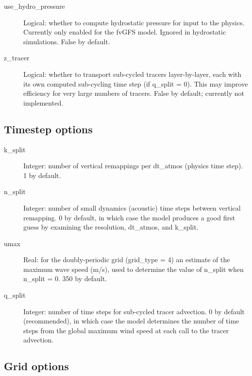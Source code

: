 \documentclass[12pt,letterpaper]{book}
\begin{document}
\begin{description}
\item[use\_hydro\_pressure] Logical: whether to compute hydrostatic pressure for input to the physics. Currently only enabled for the fvGFS model. Ignored in hydrostatic simulations. False by default.


\item[z\_tracer] Logical: whether to transport sub-cycled tracers layer-by-layer, each with its own computed sub-cycling time step 
(if q\_split = 0). This may improve efficiency for very large numbers of tracers. False by default; currently not implemented.


\end{description}

\subsection{Timestep options}

\begin{description}

\item[k\_split] Integer: number of vertical remappings per dt\_atmos 
(physics time step). 1 by default. 


\item[n\_split] Integer: number of small dynamics (acoustic) time steps between vertical remapping. 
0 by default, in which case the model produces a good first guess by examining the resolution, dt\_atmos, and k\_split. 


\item[umax] Real: for the doubly-periodic grid (grid\_type = 4) an estimate of the maximum wave speed 
(m/s), used to determine the value of n\_split when n\_split = 0. 
350 by default. 


\item[q\_split] Integer: number of time steps for sub-cycled tracer advection. 
0 by default (recommended), in which case the model determines the number of time steps from the global maximum wind speed at each call to the tracer advection.


\end{description}

\subsection{Grid options}
\end{document}
